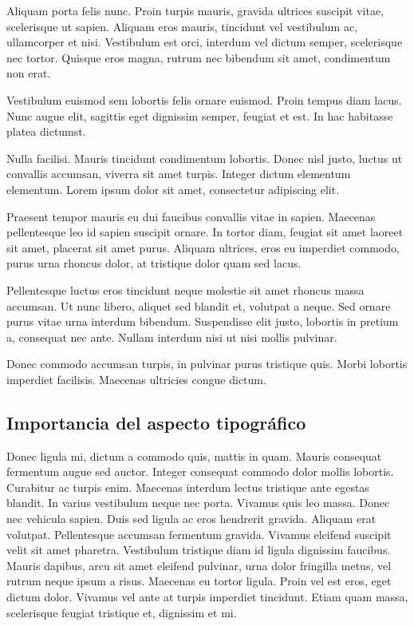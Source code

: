 \documentclass[11pt,a4paper]{article}
\begin{document}
Aliquam porta felis nunc. Proin turpis mauris, gravida ultrices suscipit vitae, scelerisque ut sapien. Aliquam eros mauris, tincidunt vel vestibulum ac, ullamcorper et nisi. Vestibulum est orci, interdum vel dictum semper, scelerisque nec tortor. Quisque eros magna, rutrum nec bibendum sit amet, condimentum non erat. 

Vestibulum euismod sem lobortis felis ornare euismod. Proin tempus diam lacus. Nunc augue elit, sagittis eget dignissim semper, feugiat et est. In hac habitasse platea dictumst.

Nulla facilisi. Mauris tincidunt condimentum lobortis. Donec nisl justo, luctus ut convallis accumsan, viverra sit amet turpis. Integer dictum elementum elementum. Lorem ipsum dolor sit amet, consectetur adipiscing elit. 

Praesent tempor mauris eu dui faucibus convallis vitae in sapien. Maecenas pellentesque leo id sapien suscipit ornare. In tortor diam, feugiat sit amet laoreet sit amet, placerat sit amet purus. Aliquam ultrices, eros eu imperdiet commodo, purus urna rhoncus dolor, at tristique dolor quam sed lacus. 

Pellentesque luctus eros tincidunt neque molestie sit amet rhoncus massa accumsan. Ut nunc libero, aliquet sed blandit et, volutpat a neque. Sed ornare purus vitae urna interdum bibendum. Suspendisse elit justo, lobortis in pretium a, consequat nec ante. Nullam interdum nisi ut nisi mollis pulvinar. 

Donec commodo accumsan turpis, in pulvinar purus tristique quis. Morbi lobortis imperdiet facilisis. Maecenas ultricies congue dictum.



\subsection{Importancia del aspecto tipográfico}


Donec ligula mi, dictum a commodo quis, mattis in quam. Mauris consequat fermentum augue sed auctor. Integer consequat commodo dolor mollis lobortis. Curabitur ac turpis enim. Maecenas interdum lectus tristique ante egestas blandit. In varius vestibulum neque nec porta. Vivamus quis leo massa. Donec nec vehicula sapien. Duis sed ligula ac eros hendrerit gravida. Aliquam erat volutpat. Pellentesque accumsan fermentum gravida. Vivamus eleifend suscipit velit sit amet pharetra. Vestibulum tristique diam id ligula dignissim faucibus. Mauris dapibus, arcu sit amet eleifend pulvinar, urna dolor fringilla metus, vel rutrum neque ipsum a risus. Maecenas eu tortor ligula. Proin vel est eros, eget dictum dolor. Vivamus vel ante at turpis imperdiet tincidunt. Etiam quam massa, scelerisque feugiat tristique et, dignissim et mi.
\end{document}
